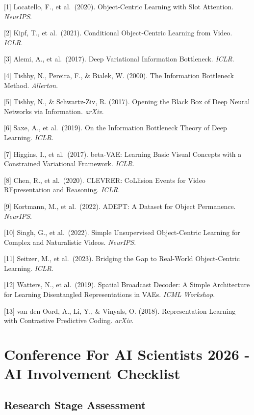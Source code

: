 \documentclass{article}
\begin{document}
[1] Locatello, F., et al.\ (2020). Object-Centric Learning with Slot Attention. \textit{NeurIPS}.

[2] Kipf, T., et al.\ (2021). Conditional Object-Centric Learning from Video. \textit{ICLR}.

[3] Alemi, A., et al.\ (2017). Deep Variational Information Bottleneck. \textit{ICLR}.

[4] Tishby, N., Pereira, F., \& Bialek, W. (2000). The Information Bottleneck Method. \textit{Allerton}.

[5] Tishby, N., \& Schwartz-Ziv, R. (2017). Opening the Black Box of Deep Neural Networks via Information. \textit{arXiv}.

[6] Saxe, A., et al.\ (2019). On the Information Bottleneck Theory of Deep Learning. \textit{ICLR}.

[7] Higgins, I., et al.\ (2017). beta-VAE: Learning Basic Visual Concepts with a Constrained Variational Framework. \textit{ICLR}.

[8] Chen, R., et al.\ (2020). CLEVRER: CoLlision Events for Video REpresentation and Reasoning. \textit{ICLR}.

[9] Kortmann, M., et al.\ (2022). ADEPT: A Dataset for Object Permanence. \textit{NeurIPS}.

[10] Singh, G., et al.\ (2022). Simple Unsupervised Object-Centric Learning for Complex and Naturalistic Videos. \textit{NeurIPS}.

[11] Seitzer, M., et al.\ (2023). Bridging the Gap to Real-World Object-Centric Learning. \textit{ICLR}.

[12] Watters, N., et al.\ (2019). Spatial Broadcast Decoder: A Simple Architecture for Learning Disentangled Representations in VAEs. \textit{ICML Workshop}.

[13] van den Oord, A., Li, Y., \& Vinyals, O. (2018). Representation Learning with Contrastive Predictive Coding. \textit{arXiv}.

\newpage

\section*{Conference For AI Scientists 2026 - AI Involvement Checklist}
\label{checklist_ai_involvement}

\subsection*{Research Stage Assessment}
\end{document}
